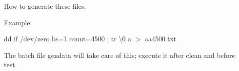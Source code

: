 How to generate these files.

Example\+:

dd if /dev/zero bs=1 count=4500 $\vert$ tr \textbackslash{}0 a \texorpdfstring{$>$}{>} aa4500.\+txt

The batch file gendata will take care of this; execute it after clean and before test. 
